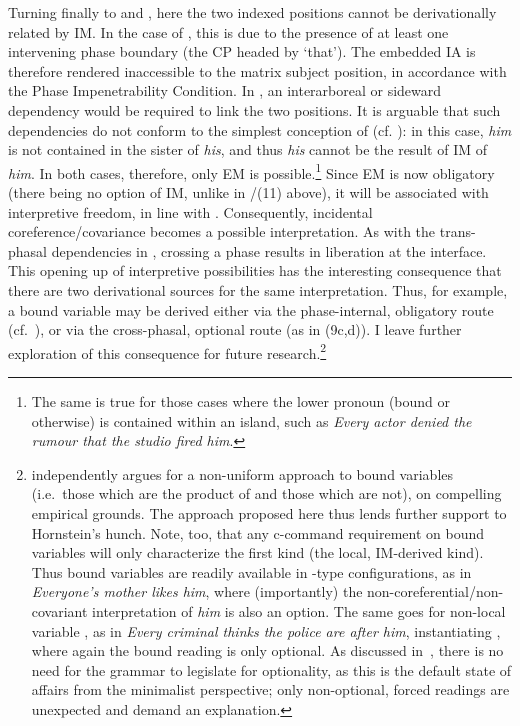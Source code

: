 \documentclass[output=paper]{langsci/langscibook}
\begin{document}
\largerpage[-2]
Turning finally to  and , here the two indexed
positions cannot be derivationally related by \gls{IM}. In the case of
, this is due to the presence of at least one intervening phase
boundary (the CP headed by \enquote*{that}). The embedded \gls{IA} is therefore rendered
inaccessible to the matrix subject position, in accordance with the Phase
Impenetrability Condition. In , an interarboreal or sideward
dependency would be required to link the two positions. It is arguable that
such dependencies do not conform to the simplest conception of  (cf.
\citealt{Chomsky2007}): in this case, \emph{him} is not contained in the sister
of \emph{his}, and thus \emph{his} cannot be the result of \gls{IM} of
\emph{him}. In both cases, therefore, only \gls{EM} is possible.\footnote{The
    same is true for those cases where the lower pronoun (bound or otherwise)
    is contained within an island, such as \emph{Every actor
    denied the rumour that the studio fired him}.} Since
    \gls{EM} is now obligatory (there being no option of \gls{IM}, unlike in
    /(11) above), it will be associated with interpretive
    freedom, in line with .  Consequently, incidental
    coreference/covariance becomes a possible interpretation. As with the
    trans-phasal dependencies in , crossing a phase results in
    liberation at the interface. This opening up of interpretive possibilities
    has the interesting consequence that there are two derivational sources for
    the same interpretation. Thus, for example, a bound variable may be derived
    either via the phase-internal, obligatory route (cf.\ ), or
    via the cross-phasal, optional route (as in (9c,d)). I leave further
    exploration of this consequence for future
    research.\footnote{\citet{Hornstein2013} independently argues for a
        non-uniform approach to bound variables (i.e.\ those which are the
        product of  and those which are not), on compelling empirical
        grounds. The approach proposed here thus lends further support to
        Hornstein’s hunch. Note, too, that any c-command requirement on bound
        variables will only characterize the first kind (the local, IM-derived
        kind). Thus bound variables are readily available in
        -type configurations, as in \emph{Everyone’s
        mother likes him}, where (importantly) the
        non-coreferential/non-covariant interpretation of \emph{him} is also an
        option. The same goes for non-local variable , as in \emph{Every
        criminal thinks the police are after him},
        instantiating , where again the bound reading is only
        optional.  As discussed in~, there is no need for
    the grammar to legislate for optionality, as this is the default state of
affairs from the minimalist perspective; only non-optional, forced readings are
unexpected and demand an explanation.}
\end{document}
